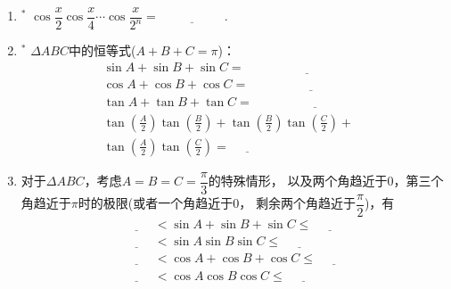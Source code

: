 \documentclass{article}
\newif\ifte
\renewcommand\leq\leqslant
\begin{document}
\begin{multicols}{2}
\begin{enumerate}[leftmargin=20pt]
\item $^*$ $ \cos\dfrac{x}{2} \cos\dfrac{x}{4}\cdots\cos\dfrac{x}{2^n}
=\underline{\ \ifte \dfrac{\sin x}{2^n \sin\dfrac{x}{2^n}}
    \else \hspace{2cm} \fi\ } $.

\item $^*$ $ \Delta ABC $中的恒等式($ A+B+C=\pi $)：
\begin{align*} 
    &\sin A +\sin B +\sin C =\underline{\ \ifte 
        4\cos\left(\tfrac{A}{2}\right)\cos\left(\tfrac{B}{2}\right)
        \cos\left(\tfrac{C}{2}\right)\else \hspace{4cm} \fi\ }  \\
    &\cos A +\cos B +\cos C =\underline{\ \ifte 
        1+4\sin\left(\tfrac{A}{2}\right)\sin\left(\tfrac{B}{2}\right)
        \sin\left(\tfrac{C}{2}\right)\else \hspace{4cm} \fi\ }  \\
    &\tan A+\tan B +\tan C =\underline{\ \ifte 
        \tan A \tan B\tan C \else \hspace{4cm} \fi\ } \\
    &\tan\left(\tfrac{A}{2}\right)\tan\left(\tfrac{B}{2}\right)+
    \tan\left(\tfrac{B}{2}\right)\tan\left(\tfrac{C}{2}\right)+\\
    &\tan\left(\tfrac{A}{2}\right)\tan\left(\tfrac{C}{2}\right)=
    \underline{\ \ifte 1\else \hspace{1cm} \fi\ } 
\end{align*}

\item 对于$ \Delta ABC $，考虑$ A=B=C=\dfrac{\pi}{3} $的特殊情形，
以及两个角趋近于0，第三个角趋近于$ \pi $时的极限(或者一个角趋近于0，
剩余两个角趋近于$ \dfrac{\pi}{2} $)，有
\begin{gather*}
    \underline{\ \ifte 0\else \hspace{1cm} \fi\ }<
    \sin A +\sin B +\sin C \leq \underline{\ \ifte 
        \frac{3\sqrt{3}}{2} \else \hspace{1cm} \fi\ } \\    
    \underline{\ \ifte 0\else \hspace{1cm} \fi\ }<
    \sin A \sin B \sin C \leq \underline{\ \ifte 
        \frac{3\sqrt{3}}{8} \else \hspace{1cm} \fi\ } \\
    \underline{\ \ifte 1\else \hspace{1cm} \fi\ }<
    \cos A +\cos B +\cos C \leq \underline{\ \ifte 
        \frac{3}{2} \else \hspace{1cm} \fi\ } \\
    \underline{\ \ifte -1\else \hspace{1cm} \fi\ }<
    \cos A\cos B\cos C \leq \underline{\ \ifte 
        \frac{1}{8} \else \hspace{1cm} \fi\ }
\end{gather*}


\end{enumerate}
\end{multicols}
\end{document}
